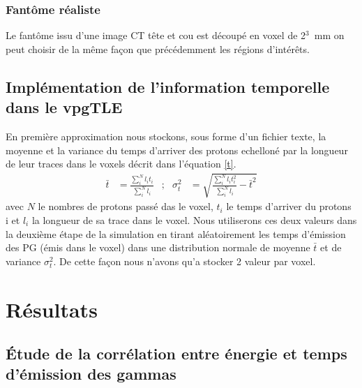 \documentclass[11pt,a4paper,oldfontcommands]{memoir}
\begin{document}
\subsubsection{Fantôme réaliste}

Le fantôme issu d'une image CT tête et cou est découpé en voxel de 2$^3$~mm on peut choisir de la même façon que précédemment les régions d’intérêts.

\subsection{Implémentation de l'information temporelle dans le vpgTLE}

En première approximation nous stockons, sous forme d'un fichier texte, la moyenne et la variance du temps d'arriver des protons echelloné par la longueur de leur traces dans le voxels décrit dans l'équation \ref{t}. 
\begin{equation}
\begin{array}{lllll}
\bar{t} &= \frac{\sum^{N}_{i} l_i t_i}{\sum^{N}_{i} l_i} &;&
\sigma_t ^2 & = \sqrt{\frac{\sum^{N}_{i}l_i t_i ^2}{\sum^{N}_{i} l_i}-\bar{t}^2}
\end{array}
\label{t}
\end{equation}
avec $N$ le nombres de protons passé das le voxel, $t_i$ le temps d'arriver du protons i et $l_i$ la longueur de sa trace dans le voxel. Nous utiliserons ces deux valeurs dans la deuxième étape de la simulation en tirant aléatoirement les temps d'émission des PG (émis dans le voxel) dans une distribution normale de moyenne $\bar{t}$ et de variance $\sigma_t ^2$. De cette façon nous n'avons qu'a stocker 2 valeur par voxel.


\section{Résultats}

\subsection{\'Etude de la corrélation entre énergie et temps d'émission des gammas}
\end{document}
